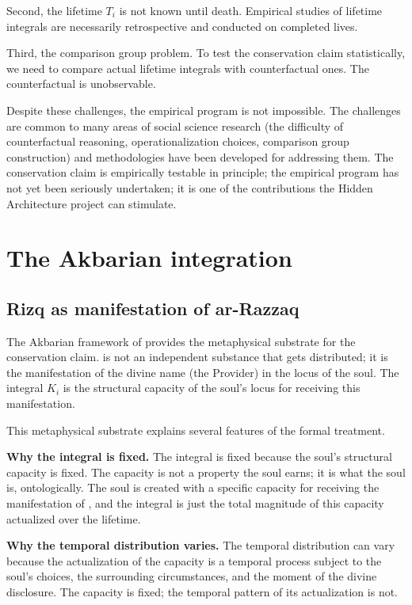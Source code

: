 Second, the lifetime $T_i$ is not known until death. Empirical
studies of lifetime integrals are necessarily retrospective and
conducted on completed lives.

Third, the comparison group problem. To test the conservation claim
statistically, we need to compare actual lifetime integrals with
counterfactual ones. The counterfactual is unobservable.

Despite these challenges, the empirical program is not impossible.
The challenges are common to many areas of social science research
(the difficulty of counterfactual reasoning, operationalization
choices, comparison group construction) and methodologies have been
developed for addressing them. The conservation claim is empirically
testable in principle; the empirical program has not yet been
seriously undertaken; it is one of the contributions the Hidden
Architecture project can stimulate.

\section{The Akbarian integration}
\label{sec:rizq-akbarian}

\subsection{Rizq as manifestation of ar-Razzaq}

The Akbarian framework of  provides the
metaphysical substrate for the conservation claim.  is
not an independent substance that gets distributed; it is the
manifestation of the divine name  (the Provider) in
the locus of the soul. The integral $K_i$ is the structural
capacity of the soul's locus for receiving this manifestation.

This metaphysical substrate explains several features of the formal
treatment.

\textbf{Why the integral is fixed.} The integral is fixed because
the soul's structural capacity is fixed. The capacity is not a
property the soul earns; it is what the soul is, ontologically.
The soul is created with a specific capacity for receiving the
manifestation of , and the integral is just the
total magnitude of this capacity actualized over the lifetime.

\textbf{Why the temporal distribution varies.} The temporal
distribution can vary because the actualization of the capacity is
a temporal process subject to the soul's choices, the surrounding
circumstances, and the moment of the divine disclosure. The
capacity is fixed; the temporal pattern of its actualization is
not.

